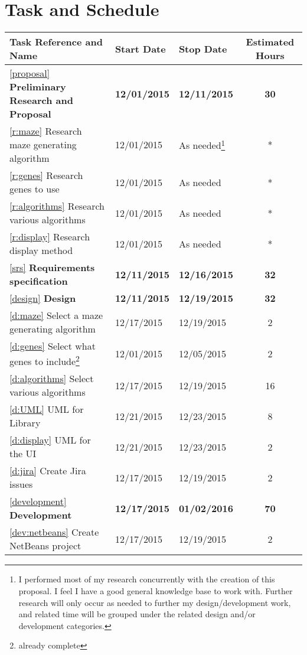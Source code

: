 \documentclass[letterpaper, 12pt]{article}
\begin{document}
  \section{Task and Schedule}
	 \begin{longtable}{lllc}
	 \toprule
	 \textbf{Task Reference and Name} & \textbf{Start Date} & \textbf{Stop Date} & \textbf{Estimated Hours}\\\midrule
	 \endhead
	 \ref{proposal} \textbf{Preliminary Research and Proposal} 	& \bf 12/01/2015 & \bf 12/11/2015 & \bf 30  \\ 
	 \ref{r:maze} Research maze generating algorithm 	& 12/01/2015 & As needed\footnote{I performed most of my research concurrently with the creation of this proposal. I feel I have a good general knowledge base to work with.  Further research will only occur as needed to further my design/development work, and related time will be grouped under the related design and/or development categories.} & *  \\
	 \ref{r:genes}	Research genes to use 					& 12/01/2015 & As needed  & *  \\
	 \ref{r:algorithms} Research various algorithms   	& 12/01/2015 & As needed  & *  \\
	 \ref{r:display} Research display method				& 12/01/2015 & As needed  & *  \\
	 \ref{srs} \textbf{Requirements specification}		& \bf 12/11/2015 & \bf 12/16/2015 & \bf 32 \\
	 \ref{design} \textbf{Design}								& \bf 12/11/2015 & \bf 12/19/2015 & \bf 32 \\
	 \ref{d:maze} Select a maze generating algorithm	& 12/17/2015 & 12/19/2015 & 2  \\
	 \ref{d:genes} Select what genes to include\footnote{already complete}	& 12/01/2015 & 12/05/2015 & 2  \\
	 \ref{d:algorithms} Select various algorithms		& 12/17/2015 & 12/19/2015 & 16 \\
	 \ref{d:UML} UML for Library								& 12/21/2015 & 12/23/2015 & 8	 \\
	 \ref{d:display} UML for the UI							& 12/21/2015 & 12/23/2015 & 2  \\
	 \ref{d:jira} Create Jira issues							& 12/17/2015 & 12/19/2015 & 2  \\
	 \ref{development} \textbf{Development}					& \bf 12/17/2015 & \bf 01/02/2016 & \bf 70 \\
	 \ref{dev:netbeans} Create NetBeans project			& 12/17/2015 & 12/19/2015 & 2  \\

\end{longtable}
\end{document}
